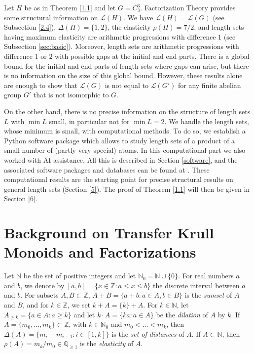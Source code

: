 \documentclass[a4paper, 10pt]{amsart}
\theoremstyle{plain}
\theoremstyle{definition}
\theoremstyle{definition}
\newcommand{\N}{\mathbb N}
\newcommand{\Z}{\mathbb Z}
\newcommand{\Q}{\mathbb Q}
\numberwithin{equation}{section}
\begin{document}
\smallskip
Let $H$ be as in Theorem \ref{1.1} and let $G = C_3^3$. Factorization Theory provides some structural information on $\mathcal L (H)$. 
We have $\mathcal L (H) = \mathcal L (G)$ (see Subsection \ref{2.4}), $\Delta (H) = \{1,2\}$, the elasticity $\rho (H) = 7/2$, and length sets having maximum elasticity are arithmetic progressions with difference $1$ (see Subsection \ref{sec:basic}). Moreover, 
length sets are arithmetic progressions with difference $1$ or $2$ with possible gaps at the initial and end parts. There is a global bound for the initial and end parts of length sets where gaps can arise, but there  is no information on the size of this global bound. However, these results alone are enough to show that $\mathcal L (G)$ is not equal to $\mathcal L (G')$ for any finite abelian group $G'$ that is not isomorphic to $G$.


On the other hand, there is no precise information on the structure of length sets $L$ with $\min L$ small, in particular not for $\min L = 2$. We handle the length sets, whose minimum is small,  with computational methods. To do so, we establish a Python software package which allows to study length sets of a product of a small number of (partly very special) atoms. In this computational part we also worked with AI assistance. All this is described in  Section \ref{software}, and the associated software packages and databases can be found at \cite{Ge-Ha-Zh27b}. These computational results are the starting point for  precise structural results on general length sets (Section \ref{5}). The proof of Theorem \ref{1.1} will then be given in Section \ref{6}.


\section{Background on Transfer Krull Monoids and Factorizations} \label{2}


Let $\N$ be the set of positive integers and let $\N_0 = \N \cup \{0\}$. For real numbers $a$ and $b$, we denote by $[a, b] = \{ x \in \Z \colon a \le x \le b\}$ the discrete interval between $a$ and $b$.
For subsets $A,B\subset\Z$,  $A+B=\{a+b\colon a\in A,b\in B\}$ is the {\it sumset} of $A$ and $B$, and for $k\in\Z$, we set $k+A=\{k\}+A$. For $k\in\N$, let $A_{\geq k}=\{a\in A \colon a\geq k\}$ and let $k\cdot A=\{ka\colon a\in A\}$ be the {\it dilation} of $A$ by $k$. If $A=\{m_0,\ldots, m_k\}\subset\Z$, with $k\in\N_0$ and $m_0<\ldots<m_k$, then $\Delta(A)=\{m_i-m_{i-1}\colon i\in [1,k]\}$ is the {\it set of distances} of $A$. 
If $A \subset \N$, then $\rho (A) = m_k/m_0 \in \Q_{\ge 1}$ is the {\it elasticity} of $A$.
\end{document}
